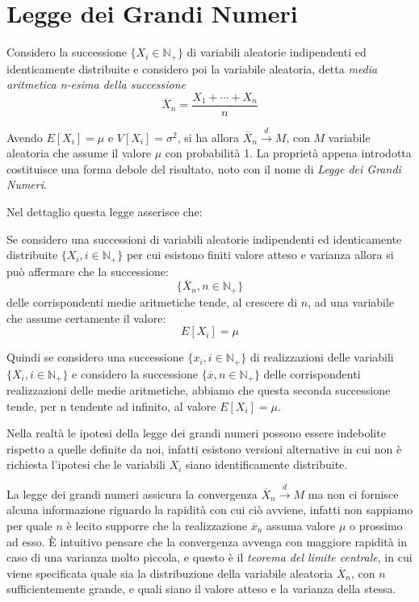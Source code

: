 \documentclass[a4paper,12pt, oneside]{book}
\newcommand{\numberset}{\mathbb}
\newcommand{\N}{\numberset{N}}
\begin{document}
\section{Legge dei Grandi Numeri}
Considero la successione $\{X_i \in \N_+\}$ di variabili aleatorie indipendenti ed identicamente distribuite e
considero poi la variabile aleatoria, detta \emph{media aritmetica n-esima della successione}
\[ \overline{X}_n = \frac{X_1 + \cdots + X_n}{n}\]

Avendo $E[X_i] = \mu$ e $V[X_i] = \sigma^2$, si ha allora $\overline{X}_n \stackrel{d}{\longrightarrow} M$,
con $M$ variabile aleatoria che assume il valore $\mu$ con probabilità 1.\newline
La proprietà appena introdotta costituisce una forma debole del risultato, noto con il nome di \emph{Legge dei Grandi Numeri}.

Nel dettaglio questa legge asserisce che:
\begin{teorema}
Se considero una successioni di variabili aleatorie indipendenti ed identicamente distribuite $\{X_i, i \in \N_+\}$
per cui esistono finiti valore atteso e varianza allora si può affermare che la successione:
\[\{\overline{X}_n, n \in \N_+\}\]
delle corrispondenti medie aritmetiche tende, al crescere di $n$, ad una variabile che assume certamente il valore:
\[E[X_i]=\mu\]
\end{teorema}
Quindi se considero una successione $\{x_i, i \in \N_+\}$ di realizzazioni delle variabili $\{X_i, i \in \N_+\}$
e considero la successione $\{\overline{x}, n \in \N_+\}$ delle corrispondenti realizzazioni delle medie aritmetiche,
abbiamo che questa seconda successione tende, per n tendente ad infinito, al valore $E[X_i] = \mu$.

Nella realtà le ipotesi della legge dei grandi numeri possono essere indebolite rispetto a quelle definite da
noi, infatti esistono versioni alternative in cui non è richiesta l'ipotesi che le variabili $X_i$ siano
identificamente distribuite.

La legge dei grandi numeri assicura la convergenza $\overline{X}_n \stackrel{d}{\longrightarrow} M$ ma non ci
fornisce alcuna informazione riguardo la rapidità con cui ciò avviene, infatti non sappiamo per quale $n$ è
lecito supporre che la realizzazione $\overline{x}_n$ assuma valore $\mu$ o prossimo ad esso.\newline
È intuitivo pensare che la convergenza avvenga con maggiore rapidità in caso di una varianza molto piccola, e
questo è il \emph{teorema del limite centrale}, in cui viene specificata quale sia la distribuzione della
variabile aleatoria $\overline{X}_n$, con $n$ sufficientemente grande, e quali siano il valore atteso e la
varianza della stessa.
\end{document}
